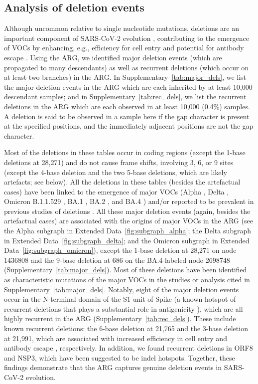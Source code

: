 \documentclass[12pt]{article}
\newcommand{\edref}[1]{Extended Data~\ref{#1}}
\newcommand{\siref}[1]{Supplementary~\ref{#1}}
\begin{document}
\subsection{Analysis of deletion events}
\label{sec:supplement_dels}

Although uncommon relative to single nucleotide mutations,
deletions are an important component of
SARS-CoV-2 evolution \cite{Jeronimo2023},
contributing to the emergence of VOCs by enhancing,
e.g., efficiency for cell entry \cite{Cantoni2022} and
potential for antibody escape \cite{McCarthy2021}.
Using the ARG, we identified major deletion events
(which are propagated to many descendants)
as well as recurrent deletions
(which occur on at least two branches) in the ARG.
In \siref{tab:major_dels},
we list the major deletion events in the ARG
which are each inherited by at least 10,000 descendant samples; and
in \siref{tab:rec_dels},
we list the recurrent deletions in the ARG
which are each observed in at least 10,000 (0.4\%) samples.
A deletion is said to be observed in a sample here
if the gap character is present at the specified positions,
and the immediately adjacent positions are not the gap
character.

Most of the deletions in these tables
occur in coding regions
(except the 1-base deletions at 28,271) and
do not cause frame shifts, involving 3, 6, or 9 sites
(except the 4-base deletion and the two 5-base deletions,
which are likely artefacts; see below).
All the deletions in these tables
(besides the artefactual cases)
have been linked to the emergence of major VOCs
(Alpha \cite{RambautAlpha2020},
Delta \cite{Stern2021},
Omicron B.1.1.529 \cite{RambautOmicron2021},
BA.1 \cite{RambautOmicron2021},
BA.2 \cite{RambautOmicron2021}, and
BA.4 \cite{Tegally2022})
and/or reported to be prevalent
in previous studies of deletions \cite{Li2023indels}.
All these major deletion events
(again, besides the artefactual cases)
are associated with the origins of major VOCs in the ARG
(see the Alpha subgraph in \edref{fig:subgraph_alpha};
the Delta subgraph in \edref{fig:subgraph_delta}; and
the Omicron subgraph in \edref{fig:subgraph_omicron}),
except the 1-base deletion at 28,271 on node 1436808
and the 9-base deletion at 686 on the BA.4-labeled node 2698748
(\siref{tab:major_dels}).
Most of these deletions have been identified
as characteristic mutations of the major VOCs
in the studies or analysis cited in \siref{tab:major_dels}.
Notably, eight of the major deletion events occur
in the N-terminal domain of the S1 unit of Spike
(a known hotspot of recurrent deletions \cite{McCarthy2021}
that plays a substantial role in antigenicity \cite{Harvey2021}),
which are all highly recurrent in the ARG
(\siref{tab:rec_dels}).
These include known recurrent deletions:
the 6-base deletion at 21,765 and
the 3-base deletion at 21,991,
which are associated with
increased efficiency in cell entry \cite{Meng2021} and
antibody escape \cite{McCarthy2021}, respectively.
In addition, we found recurrent deletions in ORF8 and NSP3,
which have been suggested to be indel hotspots\cite{Akaishi2022}.
Together, these findings demonstrate that
the ARG captures genuine deletion events in SARS-CoV-2 evolution.
\end{document}
